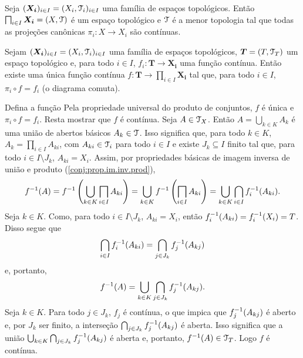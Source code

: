 \begin{prop}
Seja $(\bm{X_i})_{i \in I} = (X_i,\mathcal{T}_i)_{i \in I}$ uma família de espaços topológicos. Então $\prod_{i \in I} \bm{X_i} = (X,\topo)$ é um espaço topológico e $\mathcal{T}$ é a menor topologia tal que todas as projeções canônicas $\pi_i: X \to X_i$ são contínuas.
\end{prop}

\begin{prop}
Sejam $(\bm{X_i})_{i \in I} = (X_i,\mathcal{T}_i)_{i \in I}$ uma família de espaços topológicos, $\bm T = (T,\mathcal{T}_T)$ um espaço topológico e, para todo $i \in I$, $f_i: \bm T \to \bm{X_i}$ uma função contínua. Então existe uma única função contínua $f: \bm T \to \prod_{i \in I} \bm{X_i}$ tal que, para todo $i \in I$, $\pi_i \circ f = f_i$ (o diagrama comuta).
\begin{figure}[!h]
\centering
{}
\end{figure}
\end{prop}
\begin{defi}
Defina a função 
Pela propriedade universal do produto de conjuntos, $f$ é única e $\pi_i \circ f = f_i$. Resta mostrar que $f$ é contínua. Seja $A \in \mathcal{T}_X$. Então $A=\bigcup_{k \in K} A_k$ é uma união de abertos básicos $A_k \in \mathcal{T}$. Isso significa que, para todo $k \in K$, $A_k = \prod_{i \in I} A_{ki}$, com $A_{ki} \in \mathcal{T}_i$ para todo $i \in I$ e existe $J_k \subseteq I$ finito tal que, para todo $i \in I \setminus J_k$, $A_{ki} = X_i$. Assim, por propriedades básicas de imagem inversa de união e produto (\ref{conj:prop.im.inv.prod}),
		\begin{equation*}
		f\inv(A) = f\inv\left(\bigcup_{k \in K}\prod_{i \in I} A_{ki}\right) = \bigcup_{k \in K} f\inv \left( \prod_{i \in I} A_{ki} \right) = \bigcup_{k \in K}\bigcap_{i \in I}f_i\inv(A_{ki}).
		\end{equation*}
Seja $k \in K$. Como, para todo $i \in I \setminus J_k$, $A_{ki} = X_i$, então $f_i^{-1}(A_{ki}) = f_i^{-1}(X_i) = T$. Disso segue que
	\begin{equation*}
	\bigcap_{i \in I}f_i^{-1}(A_{ki}) = \bigcap_{j \in J_k}f_j^{-1}(A_{kj})
	\end{equation*}
e, portanto,
	\begin{equation*}
	f^{-1}(A) = \bigcup_{k \in K}\bigcap_{j \in J_k}f_j^{-1}(A_{kj}).
	\end{equation*}
Seja $k \in K$. Para todo $j \in J_k$, $f_j$ é contínua, o que impica que $f_j^{-1}(A_{kj})$ é aberto e, por $J_k$ ser finito, a interseção $\bigcap_{j \in J_k}f_j^{-1}(A_{kj})$ é aberta. Isso significa que a união $\bigcup_{k \in K}\bigcap_{j \in J_k}f_j^{-1}(A_{kj})$ é aberta e, portanto, $f^{-1}(A) \in \mathcal{T}_T$. Logo $f$ é contínua.
\end{defi}
